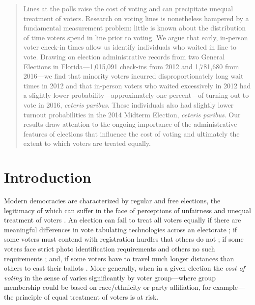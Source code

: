 \documentclass[12pt,titlepage]{article}
\begin{document}


\begin{abstract}
  \noindent 
  Lines at the polls raise the cost of voting and can precipitate
  unequal treatment of voters. \mbox{Research} on voting lines is
  nonetheless hampered by a fundamental measurement problem: little is
  known about the distribution of time voters spend in line prior to
  voting. We argue that early, in-person voter check-in times allow us
  identify individuals who waited in line to vote. Drawing on election
  administrative records from two General Elections in
  Florida---1,015,091 check-ins from 2012 and 1,781,680 from 2016---we
  find that minority voters incurred disproportionately long wait
  times in 2012 and that in-person voters who waited excessively in
  2012 had a slightly lower probability---approximately one
  percent---of turning out to vote in 2016, \emph{ceteris paribus}.
  These individuals also had slightly lower turnout probabilities in
  the 2014 Midterm Election, \emph{ceteris paribus}.  Our results draw
  attention to the ongoing importance of the administrative features
  of elections that influence the cost of voting and ultimately the
  extent to which voters are treated equally.
\end{abstract}


\newpage
\section*{Introduction}

Modern democracies are characterized by regular and free elections,
the legitimacy of which can suffer in the face of perceptions of
unfairness and unequal treatment of voters
\citep{norris2014electoral}. An election can fail to treat all voters
equally if there are meaningful differences in vote tabulating
technologies across an electorate \citep{kimballkropf:tech}; if some
voters must contend with registration hurdles that others do not
\citep{ansolhersh:registration}; if some voters face strict photo
identification requirements and others no such requirements
\citep{benteleetal:newjimcrow}; and, if some voters have to travel
much longer distances than others to cast their ballots
\citep{dyckgimpel:distance, amos_etal2017}. More generally, when in a given election
the \emph{cost of voting} in the sense of \cite{downs:econtheory}
varies significantly by voter group---where group membership could be
based on race/ethnicity or party affiliation, for example---the
principle of equal treatment of voters is at risk.
\end{document}
